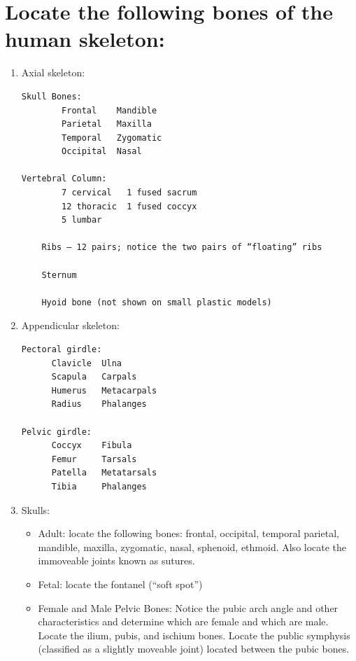 \section{Locate the following bones of the human
skeleton:}\label{locate-the-following-bones-of-the-human-skeleton}

\begin{enumerate}
\def\labelenumi{\arabic{enumi}.}
\item
  Axial skeleton:

\begin{verbatim}
Skull Bones:
        Frontal    Mandible
        Parietal   Maxilla
        Temporal   Zygomatic
        Occipital  Nasal

Vertebral Column:
        7 cervical   1 fused sacrum
        12 thoracic  1 fused coccyx
        5 lumbar

    Ribs – 12 pairs; notice the two pairs of “floating” ribs

    Sternum

    Hyoid bone (not shown on small plastic models)
\end{verbatim}
\item
  Appendicular skeleton:

\begin{verbatim}
Pectoral girdle:
      Clavicle  Ulna
      Scapula   Carpals
      Humerus   Metacarpals
      Radius    Phalanges

Pelvic girdle:
      Coccyx    Fibula
      Femur     Tarsals
      Patella   Metatarsals
      Tibia     Phalanges
\end{verbatim}
\item
  Skulls:

  \begin{itemize}
  \item
    Adult: locate the following bones: frontal, occipital, temporal
    parietal, mandible, maxilla, zygomatic, nasal, sphenoid, ethmoid.
    Also locate the immoveable joints known as sutures.
  \item
    Fetal: locate the fontanel (``soft spot'')
  \item
    Female and Male Pelvic Bones: Notice the pubic arch angle and other
    characteristics and determine which are female and which are male.
    Locate the ilium, pubis, and ischium bones. Locate the public
    symphysis (classified as a slightly moveable joint) located between
    the pubic bones.
  \end{itemize}
\end{enumerate}

